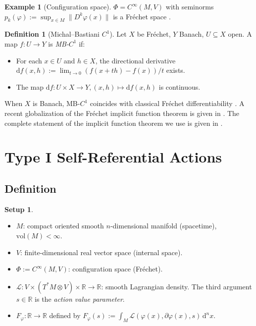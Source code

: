 \documentclass[12pt,letterpaper]{article}
\theoremstyle{definition}
\newtheorem{definition}[theorem]{Definition}
\newtheorem{example}[theorem]{Example}
\newtheorem{setup}[theorem]{Setup}
\newcommand{\mL}{\mathcal{L}}
\newcommand{\mPhi}{\Phi}
\newcommand{\vol}{\mathrm{vol}}
\newcommand{\R}{\mathbb{R}}
\newcommand{\diff}{\mathrm{d}}
\newcommand{\dVol}{\,\diff^n x}
\begin{document}
\begin{example}[Configuration space]
$\mPhi = C^\infty(M, V)$ with seminorms $p_k(\varphi) := \sup_{x \in M} \|D^k \varphi(x)\|$ is a Fr\'echet space \cite{RudinFA, Treves}.
\end{example}

\begin{definition}[Michal--Bastiani $C^1$]
\label{def:mb}
Let $X$ be Fr\'echet, $Y$ Banach, $U \subseteq X$ open. A map $f: U \to Y$ is \emph{MB-$C^1$} if:
\begin{itemize}
\item[(MB1)] For each $x \in U$ and $h \in X$, the directional derivative $\diff f(x, h) := \lim_{t \to 0} (f(x + th) - f(x))/t$ exists.
\item[(MB2)] The map $\diff f: U \times X \to Y, (x, h) \mapsto \diff f(x, h)$ is continuous.
\end{itemize}
\end{definition}

When $X$ is Banach, MB-$C^1$ coincides with classical Fr\'echet differentiability \cite{Hamilton1982, Glockner2006}. A recent globalization of the Fr\'echet implicit function theorem is given in \cite{Eftekharinasab2024}. The complete statement of the implicit function theorem we use is given in .

\section{Type I Self-Referential Actions}
\label{sec:def}

\subsection{Definition}

\begin{setup}
\label{setup:basic}
\leavevmode
\begin{itemize}
\item $M$: compact oriented smooth $n$-dimensional manifold (spacetime), $\vol(M) < \infty$.
\item $V$: finite-dimensional real vector space (internal space).
\item $\mPhi := C^\infty(M, V)$: configuration space (Fr\'echet).
\item $\mL: V \times (T^*M \otimes V) \times \R \to \R$: smooth Lagrangian density. The third argument $s \in \R$ is the \emph{action value parameter}.
\item $F_\varphi: \R \to \R$ defined by $F_\varphi(s) := \int_M \mL(\varphi(x), \partial\varphi(x), s) \dVol$.
\end{itemize}
\end{setup}
\end{document}
